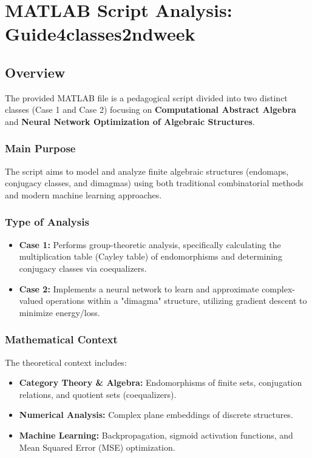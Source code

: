 \chapter{MATLAB Script Analysis: Guide4classes2ndweek}

\section{Overview}
The provided MATLAB file is a pedagogical script divided into two distinct classes (Case 1 and Case 2) focusing on \textbf{Computational Abstract Algebra} and \textbf{Neural Network Optimization of Algebraic Structures}.

\subsection{Main Purpose}
The script aims to model and analyze finite algebraic structures (endomaps, conjugacy classes, and dimagmas) using both traditional combinatorial methods and modern machine learning approaches.

\subsection{Type of Analysis}
\begin{itemize}
    \item \textbf{Case 1:} Performs group-theoretic analysis, specifically calculating the multiplication table (Cayley table) of endomorphisms and determining conjugacy classes via coequalizers.
    \item \textbf{Case 2:} Implements a neural network to learn and approximate complex-valued operations within a "dimagma" structure, utilizing gradient descent to minimize energy/loss.
\end{itemize}

\subsection{Mathematical Context}
The theoretical context includes:
\begin{itemize}
    \item \textbf{Category Theory \& Algebra:} Endomorphisms of finite sets, conjugation relations, and quotient sets (coequalizers).
    \item \textbf{Numerical Analysis:} Complex plane embeddings of discrete structures.
    \item \textbf{Machine Learning:} Backpropagation, sigmoid activation functions, and Mean Squared Error (MSE) optimization.
\end{itemize}

